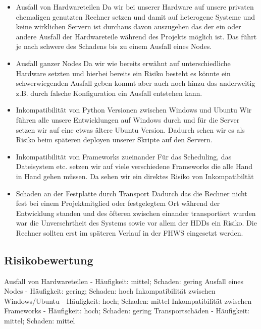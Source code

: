 \documentclass[12pt,oneside,a4paper,parskip]{scrbook}
\begin{document}
\begin{itemize}
\item Ausfall von Hardwareteilen
Da wir bei unserer Hardware auf unsere privaten ehemaligen genutzten Rechner setzen und damit auf heterogene Systeme und keine wirklichen Servern ist durchaus davon auszugehen das der ein oder andere Ausfall der Hardwareteile während des Projekts möglich ist. Das führt je nach schwere des Schadens bis zu einem Ausfall eines Nodes.
\item Ausfall ganzer Nodes
Da wir wie bereits erwähnt auf unterschiedliche Hardware setzten und hierbei bereits ein Risiko besteht es könnte ein schwerwiegenden Ausfall geben kommt aber auch noch hinzu das anderweitig z.B. durch falsche Konfiguration ein Ausfall entstehen kann.
\item Inkompatibilität von Python Versionen zwischen Windows und Ubuntu
Wir führen alle unsere Entwicklungen auf Windows durch und für die Server setzen wir auf eine etwas ältere Ubuntu Version. Dadurch sehen wir es als Risiko beim späteren deployen unserer Skripte auf den Servern.
\item Inkompatibilität von Frameworks zueinander
Für das Scheduling, das Dateisystem etc. setzen wir auf viele verschiedene Frameworks die alle Hand in Hand gehen müssen. Da sehen wir ein direktes Risiko von Inkompatibiltät
\item Schaden an der Festplatte durch Transport
Dadurch das die Rechner nicht fest bei einem Projektmitglied oder festgelegtem Ort während der Entwicklung standen und des öfteren zwischen einander
transportiert wurden war die Unversehrtheit des Systems sowie vor allem der HDDs ein Risiko. Die Rechner sollten erst im späteren Verlauf in der FHWS eingesetzt werden.
\end{itemize}
\subsection{Risikobewertung}
Ausfall von Hardwareteilen - Häufigkeit: mittel; Schaden: gering
Ausfall eines Nodes - Häufigkeit: gering; Schaden: hoch
Inkompatibilität zwischen Windows/Ubuntu - Häufigkeit: hoch; Schaden: mittel
Inkompatibilität zwischen Frameworks - Häufigkeit: hoch; Schaden: gering
Transportschäden - Häufigkeit: mittel; Schaden: mittel
\end{document}
